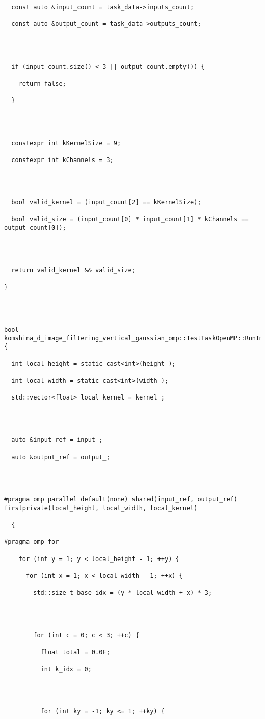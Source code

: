 \documentclass[12pt]{article}
\begin{document}
\begin{lstlisting}
  const auto &input_count = task_data->inputs_count;

  const auto &output_count = task_data->outputs_count;




  if (input_count.size() < 3 || output_count.empty()) {

    return false;

  }




  constexpr int kKernelSize = 9;

  constexpr int kChannels = 3;




  bool valid_kernel = (input_count[2] == kKernelSize);

  bool valid_size = (input_count[0] * input_count[1] * kChannels == output_count[0]);




  return valid_kernel && valid_size;

}




bool komshina_d_image_filtering_vertical_gaussian_omp::TestTaskOpenMP::RunImpl() {

  int local_height = static_cast<int>(height_);

  int local_width = static_cast<int>(width_);

  std::vector<float> local_kernel = kernel_;




  auto &input_ref = input_;

  auto &output_ref = output_;




#pragma omp parallel default(none) shared(input_ref, output_ref) firstprivate(local_height, local_width, local_kernel)

  {

#pragma omp for

    for (int y = 1; y < local_height - 1; ++y) {

      for (int x = 1; x < local_width - 1; ++x) {

        std::size_t base_idx = (y * local_width + x) * 3;




        for (int c = 0; c < 3; ++c) {

          float total = 0.0F;

          int k_idx = 0;




          for (int ky = -1; ky <= 1; ++ky) {


\end{lstlisting}
\end{document}
